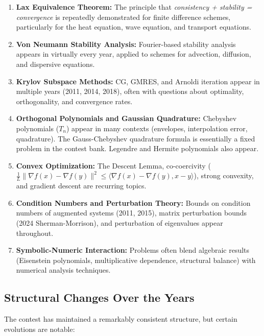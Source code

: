 \begin{enumerate}
\item \textbf{Lax Equivalence Theorem:} The principle that \textit{consistency + stability = convergence} is repeatedly demonstrated for finite difference schemes, particularly for the heat equation, wave equation, and transport equations.

\item \textbf{Von Neumann Stability Analysis:} Fourier-based stability analysis appears in virtually every year, applied to schemes for advection, diffusion, and dispersive equations.

\item \textbf{Krylov Subspace Methods:} CG, GMRES, and Arnoldi iteration appear in multiple years (2011, 2014, 2018), often with questions about optimality, orthogonality, and convergence rates.

\item \textbf{Orthogonal Polynomials and Gaussian Quadrature:} Chebyshev polynomials ($T_n$) appear in many contexts (envelopes, interpolation error, quadrature). The Gauss-Chebyshev quadrature formula is essentially a fixed problem in the contest bank. Legendre and Hermite polynomials also appear.

\item \textbf{Convex Optimization:} The Descent Lemma, co-coercivity ($\frac{1}{L}\|\nabla f(x) - \nabla f(y)\|^2 \leq \langle \nabla f(x) - \nabla f(y), x-y\rangle$), strong convexity, and gradient descent are recurring topics.

\item \textbf{Condition Numbers and Perturbation Theory:} Bounds on condition numbers of augmented systems (2011, 2015), matrix perturbation bounds (2024 Sherman-Morrison), and perturbation of eigenvalues appear throughout.

\item \textbf{Symbolic-Numeric Interaction:} Problems often blend algebraic results (Eisenstein polynomials, multiplicative dependence, structural balance) with numerical analysis techniques.
\end{enumerate}

\subsection{Structural Changes Over the Years}

The contest has maintained a remarkably consistent structure, but certain evolutions are notable:

